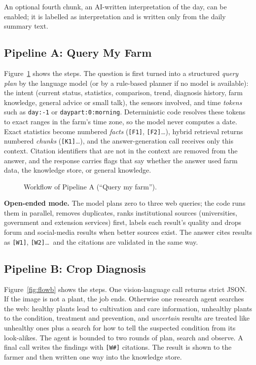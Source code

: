 An optional fourth chunk, an AI-written interpretation of the day, can be enabled; it is labelled as interpretation and is
written only from the daily summary text.

\subsection{Pipeline A: Query My Farm}

Figure~\ref{fig:flowa} shows the steps. The question is first turned into a structured \emph{query plan} by the language model (or by a
rule-based planner if no model is available): the intent (current status, statistics, comparison, trend, diagnosis history,
farm knowledge, general advice or small talk), the sensors involved, and time \emph{tokens} such as \texttt{day:-1} or
\texttt{daypart:0:morning}. Deterministic code resolves these tokens to exact ranges in the farm's time zone, so the model never
computes a date. Exact statistics become numbered \emph{facts} (\texttt{[F1]}, \texttt{[F2]}\ldots), hybrid retrieval returns
numbered \emph{chunks} (\texttt{[K1]}\ldots), and the answer-generation call receives only this context. Citation identifiers that are
not in the context are removed from the answer, and the response carries flags that say whether the answer used farm data,
the knowledge store, or general knowledge.

\begin{figure}[H]
\centering

\caption{Workflow of Pipeline A (``Query my farm'').}
\label{fig:flowa}
\end{figure}

\noindent\textbf{Open-ended mode.} The model plans zero to three web queries; the code runs them in parallel, removes duplicates,
ranks institutional sources (universities, government and extension services) first, labels each result's quality and drops
forum and social-media results when better sources exist. The answer cites results as \texttt{[W1]}, \texttt{[W2]}\ldots\ and the
citations are validated in the same way.

\subsection{Pipeline B: Crop Diagnosis}

Figure~\ref{fig:flowb} shows the steps. One vision-language call returns strict JSON. If the image is not a plant, the job ends.
Otherwise one research agent searches the web: healthy plants lead to cultivation and care information, unhealthy plants to
the condition, treatment and prevention, and \emph{uncertain} results are treated like unhealthy ones plus a search for how to
tell the suspected condition from its look-alikes. The agent is bounded to two rounds of plan, search and observe. A
final call writes the findings with \texttt{[W\#]} citations. The result is shown to the farmer and then written one way into the
knowledge store.

